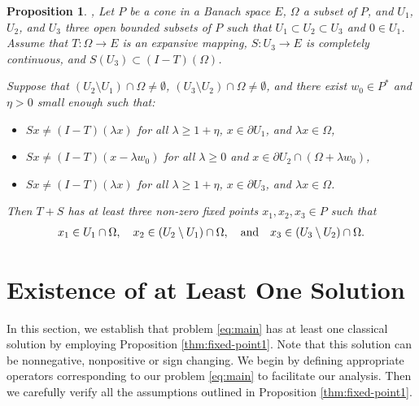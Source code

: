 \documentclass[reqno, 12pt]{amsart}
\newtheorem{pro}{Proposition}[section]
\numberwithin{equation}{section}
\begin{document}
\begin{pro} \label{thm:fixed-point3}
\cite[Thm. 2.3]{3}, \cite[Thm. 2.3]{15}
Let $P$ be a cone in a Banach space $E$, $\Omega$ a subset of $P$, and $U_1$, $U_2$, and $U_3$ three open bounded subsets of $P$ such that $U_1 \subset U_2 \subset U_3$ and $0 \in U_1$. Assume that $T: \Omega \to E$ is an expansive mapping, $S: U_3 \to E$ is completely continuous, and $S(U_3) \subset (I - T)(\Omega)$.

Suppose that $(U_2 \setminus U_1) \cap \Omega \neq \emptyset$, $(U_3 \setminus U_2) \cap \Omega \neq \emptyset$, and there exist $w_0 \in P^*$ and $\eta > 0$ small enough such that:
\begin{itemize}
\item[(i)] $Sx \neq (I - T)(\lambda x)$ for all $\lambda \geq 1 + \eta$, $x \in \partial U_1$, and $\lambda x \in \Omega$,
\item[(ii)] $Sx \neq (I - T)(x - \lambda w_0)$ for all $\lambda \geq 0$ and $x \in \partial U_2 \cap (\Omega + \lambda w_0)$,
\item[(iii)] $Sx \neq (I - T)(\lambda x)$ for all $\lambda \geq 1 + \eta$, $x \in \partial U_3$, and $\lambda x \in \Omega$.
\end{itemize}

Then $T + S$ has at least three non-zero fixed points $x_1, x_2, x_3 \in P$ such that
\begin{align}
x_1 \in U_1 \cap \Omega, \quad x_2 \in (U_2 \setminus U_1) \cap \Omega, \quad \text{and} \quad x_3 \in (U_3 \setminus U_2) \cap \Omega. \notag
\end{align}
\end{pro}


\section{Existence of at Least One Solution}
\label{one-solution}

In this section, we establish that problem \eqref{eq:main} has at least one classical solution by employing Proposition \ref{thm:fixed-point1}. Note that this solution can be nonnegative, nonpositive or sign changing. We begin by defining appropriate operators corresponding to our problem \eqref{eq:main} to facilitate our analysis. Then we carefully verify all the assumptions outlined in Proposition \ref{thm:fixed-point1}.
\end{document}
